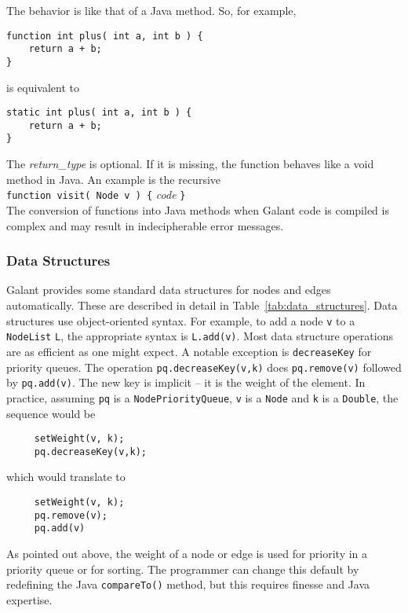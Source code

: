 The behavior is like that of a Java method. So, for example,
\begin{verbatim}
function int plus( int a, int b ) {
    return a + b;
}
\end{verbatim}
is equivalent to
\begin{verbatim}
static int plus( int a, int b ) {
    return a + b;
}
\end{verbatim}

The \textsl{return\_type} is optional. If it is missing, the function behaves like
a \textsf{void} method in Java. An example is the recursive
\\
\texttt{function visit( Node v ) \{} \textsl{code} \texttt{\}}
\\
The conversion of functions into Java methods when Galant code is compiled
is complex and may result in indecipherable error messages.



\subsubsection{Data Structures}

Galant provides some standard data structures for nodes and edges automatically.
These are described in detail in Table~\ref{tab:data_structures}.
Data structures use object-oriented syntax.
For example, to add a node \texttt{v} to a \texttt{NodeList} \texttt{L},
the appropriate syntax is \texttt{L.add(v)}.
Most data structure operations are as efficient as one might expect.
A notable exception is \texttt{decreaseKey}
for priority queues.
The operation \texttt{pq.decreaseKey(v,k)}
does \texttt{pq.remove(v)} followed by \texttt{pq.add(v)}.
The new key is implicit -- it is the weight of the element.
In practice, assuming \texttt{pq} is a \texttt{NodePriorityQueue},
\texttt{v} is a \texttt{Node}
and \texttt{k} is a \texttt{Double}, the sequence would be
\begin{verbatim}
     setWeight(v, k);
     pq.decreaseKey(v,k);
\end{verbatim}
which would translate to
\begin{verbatim}
     setWeight(v, k);
     pq.remove(v);
     pq.add(v)
\end{verbatim}
As pointed out above, the weight of a node or edge is used for priority in a priority
queue or for sorting.
The programmer can change this default
by redefining the Java \texttt{compareTo()} method,
but this requires finesse and Java expertise.
